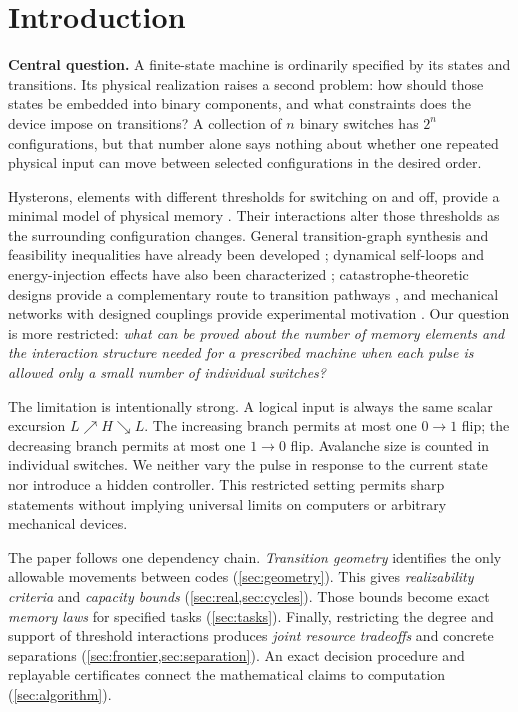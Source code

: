 \documentclass[12pt,letterpaper]{article}
\theoremstyle{definition}\newtheorem{definition}[theorem]{Definition}
\theoremstyle{remark}\newtheorem{remark}[theorem]{Remark}
\begin{document}
\section{Introduction}
\noindent\textbf{Central question.} A finite-state machine is ordinarily specified by its states and transitions. Its physical realization raises a second problem: how should those states be embedded into binary components, and what constraints does the device impose on transitions? A collection of $n$ binary switches has $2^n$ configurations, but that number alone says nothing about whether one repeated physical input can move between selected configurations in the desired order.

Hysterons, elements with different thresholds for switching on and off, provide a minimal model of physical memory \citep{preisach1935,liu2024}. Their interactions alter those thresholds as the surrounding configuration changes. General transition-graph synthesis and feasibility inequalities have already been developed \citep{teunisse2025}; dynamical self-loops and energy-injection effects have also been characterized \citep{baconnier2025}; catastrophe-theoretic designs provide a complementary route to transition pathways \citep{muhaxheri2025}, and mechanical networks with designed couplings provide experimental motivation \citep{shohat2025,paulsen2026,ali2026}. Our question is more restricted: \emph{what can be proved about the number of memory elements and the interaction structure needed for a prescribed machine when each pulse is allowed only a small number of individual switches?}

The limitation is intentionally strong. A logical input is always the same scalar excursion $L\nearrow H\searrow L$. The increasing branch permits at most one $0\to1$ flip; the decreasing branch permits at most one $1\to0$ flip. Avalanche size is counted in individual switches. We neither vary the pulse in response to the current state nor introduce a hidden controller. This restricted setting permits sharp statements without implying universal limits on computers or arbitrary mechanical devices.

The paper follows one dependency chain. \emph{Transition geometry} identifies the only allowable movements between codes (\cref{sec:geometry}). This gives \emph{realizability criteria} and \emph{capacity bounds} (\cref{sec:real,sec:cycles}). Those bounds become exact \emph{memory laws} for specified tasks (\cref{sec:tasks}). Finally, restricting the degree and support of threshold interactions produces \emph{joint resource tradeoffs} and concrete separations (\cref{sec:frontier,sec:separation}). An exact decision procedure and replayable certificates connect the mathematical claims to computation (\cref{sec:algorithm}).
\end{document}
